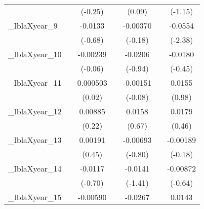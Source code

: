 {\begin{tabular}{l*{6}{c}}
            &                     &     (-0.25)         &                     &      (0.09)         &                     &     (-1.15)         \\
[1em]
\_IblaXyear\_9&                     &     -0.0133         &                     &    -0.00370         &                     &     -0.0554\sym{*}  \\
            &                     &     (-0.68)         &                     &     (-0.18)         &                     &     (-2.38)         \\
[1em]
\_IblaXyear\_10&                     &    -0.00239         &                     &     -0.0206         &                     &     -0.0180         \\
            &                     &     (-0.06)         &                     &     (-0.94)         &                     &     (-0.45)         \\
[1em]
\_IblaXyear\_11&                     &    0.000503         &                     &    -0.00151         &                     &      0.0155         \\
            &                     &      (0.02)         &                     &     (-0.08)         &                     &      (0.98)         \\
[1em]
\_IblaXyear\_12&                     &     0.00885         &                     &      0.0158         &                     &      0.0179         \\
            &                     &      (0.22)         &                     &      (0.67)         &                     &      (0.46)         \\
[1em]
\_IblaXyear\_13&                     &     0.00191         &                     &    -0.00693         &                     &    -0.00189         \\
            &                     &      (0.45)         &                     &     (-0.80)         &                     &     (-0.18)         \\
[1em]
\_IblaXyear\_14&                     &     -0.0117         &                     &     -0.0141         &                     &    -0.00872         \\
            &                     &     (-0.70)         &                     &     (-1.41)         &                     &     (-0.64)         \\
[1em]
\_IblaXyear\_15&                     &    -0.00590         &                     &     -0.0267         &                     &      0.0143         \\

\end{tabular}}
